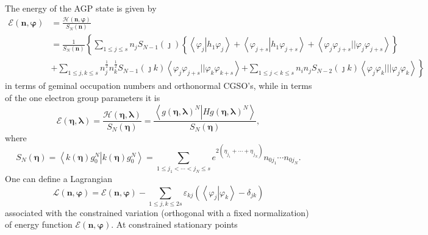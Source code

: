 \documentclass[aps,preprint]{revtex4}%
\begin{document}
The energy of the AGP state is given by \emph{ }
\begin{align}
\mathcal{E}\left(  \mathbf{n,\varphi}\right)   &  =\frac{\mathcal{H}\left(
\mathbf{n,\varphi}\right)  }{S_{N}\left(  \mathbf{n}\right)  }\nonumber\\
&  =\frac{1}{S_{N}\left(  \mathbf{n}\right)  }\left\{  \sum_{1\leq j\leq
s}n_{j}S_{N-1}\left(  \jmath\right)  \left\{  \left\langle \varphi
_{j}\left\vert h_{1}\varphi_{j}\right.  \right\rangle +\left\langle
\varphi_{j+s}\left\vert h_{1}\varphi_{j+s}\right.  \right\rangle +\left\langle
\varphi_{j}\varphi_{j+s}||\varphi_{j}\varphi_{j+s}\right\rangle \right\}
\right. \nonumber\\
&  +\sum_{1\leq j,k\leq s}n_{j}^{\frac{1}{2}}n_{k}^{\frac{1}{2}}S_{N-1}\left(
\jmath k\right)  \left\langle \varphi_{j}\varphi_{j+s}||\varphi_{k}%
\varphi_{k+s}\right\rangle \left.  +\sum_{1\leq j<k\leq s}n_{i}n_{j}%
S_{N-2}\left(  \jmath k\right)  \left\langle \varphi_{j}\varphi_{k}%
|||\varphi_{j}\varphi_{k}\right\rangle \right\}  \label{energy}%
\end{align}
in terms of geminal occupation numbers and orthonormal CGSO's, while in terms
of the one electron group parameters it is
\begin{equation}
\mathcal{E}\left(  \mathbf{\eta},\mathbf{\lambda}\right)  =\frac
{\mathcal{H}\left(  \mathbf{\eta},\mathbf{\lambda}\right)  }{S_{N}\left(
\mathbf{\eta}\right)  }=\frac{\left\langle \left.  g\left(  \mathbf{\eta
},\mathbf{\lambda}\right)  ^{N}\right\vert Hg\left(  \mathbf{\eta
},\mathbf{\lambda}\right)  ^{N}\right\rangle }{S_{N}\left(  \mathbf{\eta
}\right)  }, \label{gp_funct}%
\end{equation}
where%
\begin{equation}
S_{N}\left(  \mathbf{\eta}\right)  =\left\langle \left.  k\left(
\mathbf{\eta}\right)  g_{0}^{N}\right\vert k\left(  \mathbf{\eta}\right)
g_{0}^{N}\right\rangle =\sum_{1\leq j_{1}<\cdots<j_{N}\leq s}e^{2\left(
\eta_{j_{1}}+\cdots+\eta_{j_{N}}\right)  }n_{0j_{1}}\cdots n_{0j_{N}}.
\end{equation}
One can define a Lagrangian
\begin{equation}
\mathcal{L}\left(  \mathbf{n,\varphi}\right)  =\mathcal{E}\left(
\mathbf{n,\varphi}\right)  -\sum_{1\leq j,k\leq2s}\varepsilon_{kj}\left(
\left\langle \left.  \varphi_{j}\right\vert \varphi_{k}\right\rangle
-\delta_{jk}\right)
\end{equation}
associated with the constrained variation (orthogonal with a fixed
normalization) of energy function $\mathcal{E}\left(  \mathbf{n,\varphi
}\right)  .$ At constrained stationary points
\end{document}
